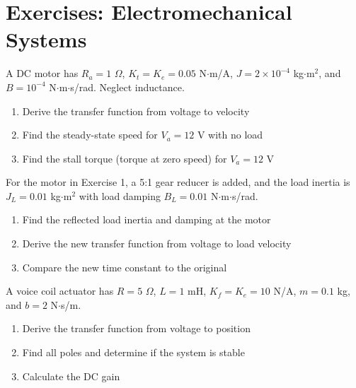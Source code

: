 \section{Exercises: Electromechanical Systems}

\begin{exercise}
A DC motor has $R_a = 1$ $\Omega$, $K_t = K_e = 0.05$ N$\cdot$m/A, $J = 2 \times 10^{-4}$ kg$\cdot$m$^2$, and $B = 10^{-4}$ N$\cdot$m$\cdot$s/rad. Neglect inductance.
\begin{enumerate}[label=(\alph*)]
    \item Derive the transfer function from voltage to velocity
    \item Find the steady-state speed for $V_a = 12$ V with no load
    \item Find the stall torque (torque at zero speed) for $V_a = 12$ V
\end{enumerate}
\end{exercise}

\begin{exercise}
For the motor in Exercise 1, a 5:1 gear reducer is added, and the load inertia is $J_L = 0.01$ kg$\cdot$m$^2$ with load damping $B_L = 0.01$ N$\cdot$m$\cdot$s/rad.
\begin{enumerate}[label=(\alph*)]
    \item Find the reflected load inertia and damping at the motor
    \item Derive the new transfer function from voltage to load velocity
    \item Compare the new time constant to the original
\end{enumerate}
\end{exercise}

\begin{exercise}
A voice coil actuator has $R = 5$ $\Omega$, $L = 1$ mH, $K_f = K_e = 10$ N/A, $m = 0.1$ kg, and $b = 2$ N$\cdot$s/m.
\begin{enumerate}[label=(\alph*)]
    \item Derive the transfer function from voltage to position
    \item Find all poles and determine if the system is stable
    \item Calculate the DC gain
\end{enumerate}
\end{exercise}

